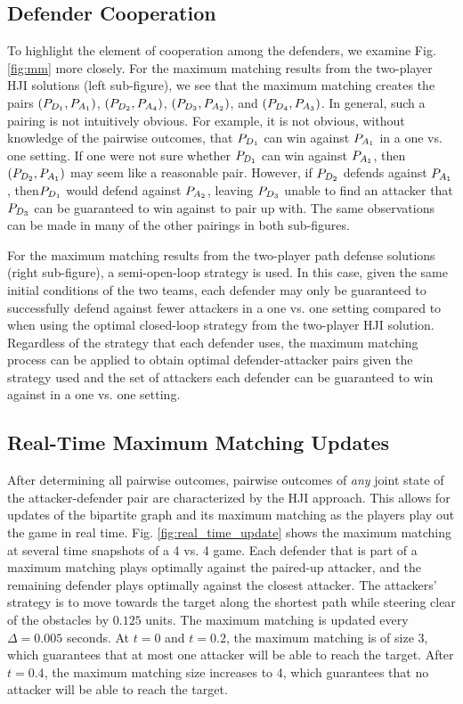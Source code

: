 \subsection{Defender Cooperation}
To highlight the element of cooperation among the defenders, we examine Fig. \ref{fig:mm} more closely. For the maximum matching results from the two-player HJI solutions (left sub-figure), we see that the maximum matching creates the pairs $(P_{D_{1}}, P_{A_{1}})$, $(P_{D_{2}}, P_{A_{4}})$, $(P_{D_{3}}, P_{A_{2}})$, and $(P_{D_{4}}, P_{A_{3}})$. In general, such a pairing is not intuitively obvious. For example, it is not obvious, without knowledge of the pairwise outcomes, that $P_{D_{1}}$ can win against $P_{A_{1}}$ in a one vs. one setting. If one were not sure whether $P_{D_{1}}$ can win against $P_{A_{1}}$, then $(P_{D_{2}}, P_{A_{1}})$ may seem like a reasonable pair. However, if $P_{D_{2}}$ defends against $P_{A_{1}}$, then$P_{D_{1}}$ would defend against $P_{A_{2}}$, leaving $P_{D_{3}}$ unable to find an attacker that $P_{D_{3}}$ can be guaranteed to win against to pair up with. The same observations can be made in many of the other pairings in both sub-figures.

For the maximum matching results from the two-player path defense solutions (right sub-figure), a semi-open-loop strategy is used. In this case, given the same initial conditions of the two teams, each defender may only be guaranteed to successfully defend against fewer attackers in a one vs. one setting compared to when using the optimal closed-loop strategy from the two-player HJI solution. Regardless of the strategy that each defender uses, the maximum matching process can be applied to obtain optimal defender-attacker pairs given the strategy used and the set of attackers each defender can be guaranteed to win against in a one vs. one setting.

\subsection{Real-Time Maximum Matching Updates}
After determining all pairwise outcomes, pairwise outcomes of \textit{any} joint state of the attacker-defender pair are characterized by the HJI approach. This allows for updates of the bipartite graph and its maximum matching as the players play out the game in real time. Fig. \ref{fig:real_time_update} shows the maximum matching at several time snapshots of a 4 vs. 4 game. Each defender that is part of a maximum matching plays optimally against the paired-up attacker, and the remaining defender plays optimally against the closest attacker. The attackers' strategy is to move towards the target along the shortest path while steering clear of the obstacles by $0.125$ units. The maximum matching is updated every $\Delta=0.005$ seconds. At $t=0$ and $t=0.2$, the maximum matching is of size 3, which guarantees that at most one attacker will be able to reach the target. After $t=0.4$, the maximum matching size increases to 4, which guarantees that no attacker will be able to reach the target.

